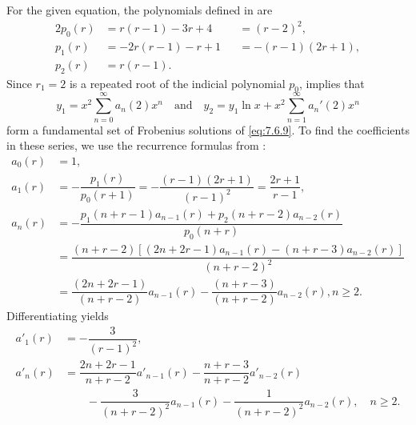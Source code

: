 \begin{solution}
For the given equation,  the polynomials defined in
 are
\begin{alignat*}{2}
p_0(r)&=r(r-1)-3r+4&&=(r-2)^2,\\
p_1(r)&=-2r(r-1)-r+1&&=-(r-1)(2r+1),\\
p_2(r)&=r(r-1).
\end{alignat*}
Since $r_1=2$ is a repeated root of the indicial polynomial $p_0$,
 implies that
\begin{equation} \label{eq:7.6.10}
y_1=x^2\sum_{n=0}^\infty  a_n(2)x^n\quad\text{and}\quad
y_2=y_1\ln x+x^2\sum_{n=1}^\infty a_n'(2)x^n
\end{equation}
form a fundamental set of  Frobenius solutions of \eqref{eq:7.6.9}.
To find the coefficients in these series, we use the recurrence
formulas from :
\begin{equation} \label{eq:7.6.11}
\begin{aligned}
a_0(r)&=1,\\
a_1(r)&=-\dfrac{p_1(r)}{p_0(r+1)}=-\dfrac{(r-1)(2r+1)}{(r-1)^2}
=\dfrac{2r+1}{r-1},\\
a_n(r)&=-\dfrac{p_1(n+r-1)a_{n-1}(r)+p_2(n+r-2)a_{n-2}(r)}{p_0(n+r)}\\
&=\dfrac{(n+r-2)\left[(2n+2r-1)a_{n-1}(r)
-(n+r-3)a_{n-2}(r)\right]}{(n+r-2)^2}\\
&=\dfrac{(2n+2r-1)}{(n+r-2)}a_{n-1}(r)-
\dfrac{(n+r-3)}{(n+r-2)}a_{n-2}(r),n\ge2.
\end{aligned}
\end{equation}
Differentiating yields
\begin{equation} \label{eq:7.6.12}
\begin{aligned}
a'_1(r)&=-\dfrac{3}{(r-1)^2},\\
a'_n(r)
&=\dfrac{2n+2r-1}{n+r-2}a'_{n-1}(r)-\dfrac{n+r-3}{n+r-2}a'_{n-2}(r)\\
&\qquad{}-\dfrac{3}{(n+r-2)^2}a_{n-1}(r)-\dfrac{1}{(n+r-2)^2}a_{n-2}(r),\quad
n\ge2.
\end{aligned}
\end{equation}


\end{solution}
